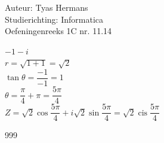 \documentclass[a4paper]{article}
\begin{document}
  
\noindent \large Auteur: Tyas Hermans \\
\noindent \large Studierichting: Informatica\\
\noindent \large Oefeningenreeks 1C nr. 11.14\\

\medskip

\normalsize

$-1-i$\\

$r = \sqrt{1+1} = \sqrt{2}$\\

$\tan{\theta} = \dfrac{-1}{-1} = 1$\\

$\theta = \dfrac{\pi}{4} + \pi = \dfrac{5\pi}{4}$\\

$Z = \sqrt{2}\cos\dfrac{5\pi}{4} + i\sqrt{2}\sin\dfrac{5\pi}{4} = \sqrt{2}\operatorname{cis}\dfrac{5\pi}{4}$\\



\begin{thebibliography}{999}
\end{thebibliography}
\end{document}
